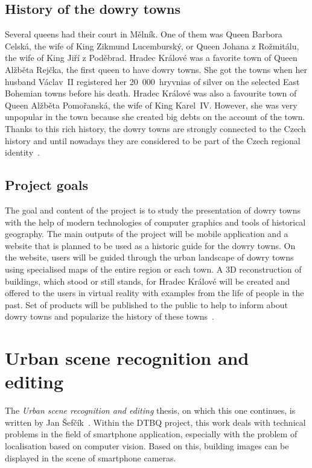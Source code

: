 \documentclass[thesis=B,english]{FITthesis}[2019/12/23]
\begin{document}
        \subsection{History of the dowry towns}
        Several queens had their court in Mělník. One of them was Queen Barbora Celská, the wife of King Zikmund Lucemburský, or Queen Johana z Rožmitálu, the wife of King Jiří z Poděbrad. Hradec Králové was a favorite town of Queen Alžběta Rejčka, the first queen to have dowry towns. She got the towns when her husband Václav~\RN{2} registered her 20~000~hryvnias of silver on the selected East Bohemian towns before his death. Hradec Králové was also a favourite town of Queen Alžběta Pomořanská, the wife of King Karel~\RN{4}. However, she was very unpopular in the town because she created big debts on the account of the town. Thanks to this rich history, the dowry towns are strongly connected to the Czech history and until nowadays they are considered to be part of the Czech regional identity~\cite{ghLr7y27wY4pk4xP}.
        
        \subsection{Project goals}
        The goal and content of the project is to study the presentation of dowry towns with the help of modern technologies of computer graphics and tools of historical geography. The main outputs of the project will be mobile application and a website that is planned to be used as a historic guide for the dowry towns. On the website, users will be guided through the urban landscape of dowry towns using specialised maps of the entire region or each town. A 3D reconstruction of buildings, which stood or still stands, for Hradec Králové will be created and offered to the users in virtual reality with examples from the life of people in the past. Set of products will be published to the public to help to inform about dowry towns and popularize the history of these towns~\cite{ghLr7y27wY4pk4xP}.
    
    \section{Urban scene recognition and editing}
        The \textit{Urban scene recognition and editing} thesis, on which this one continues, is written by Jan Šefčík~\cite{Sefcik2020}. Within the DTBQ project, this work deals with technical problems in the field of smartphone application, especially with the problem of localisation based on computer vision. Based on this, building images can be displayed in the scene of smartphone cameras.
        
\end{document}
